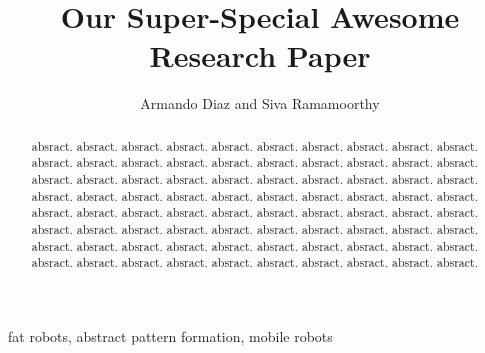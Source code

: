 \documentclass[preprint,10pt]{elsarticle}
\begin{document}

\begin{frontmatter}



\title{Our Super-Special Awesome Research Paper}


\author{Armando Diaz and Siva Ramamoorthy}

\address{\{ ajdt, sivanr\}@cs.washington.edu}

\begin{abstract}
absract. absract. absract. absract. absract. absract. absract. absract. absract. absract. absract. absract. absract. absract. absract. absract. absract. absract. absract. absract. absract. absract. absract. absract. absract. absract. absract. absract. absract. absract. absract. absract. absract. absract. absract. absract. absract. absract. absract. absract. absract. absract. absract. absract. absract. absract. absract. absract. absract. absract. absract. absract. absract. absract. absract. absract. absract. absract. absract. absract. absract. absract. absract. absract. absract. absract. absract. absract. absract. absract. absract. absract. absract. absract. absract. absract. absract. absract. absract. absract. 

\end{abstract}

\begin{keyword}
fat robots, abstract pattern formation, mobile robots
\end{keyword}

\end{frontmatter}
\end{document}
